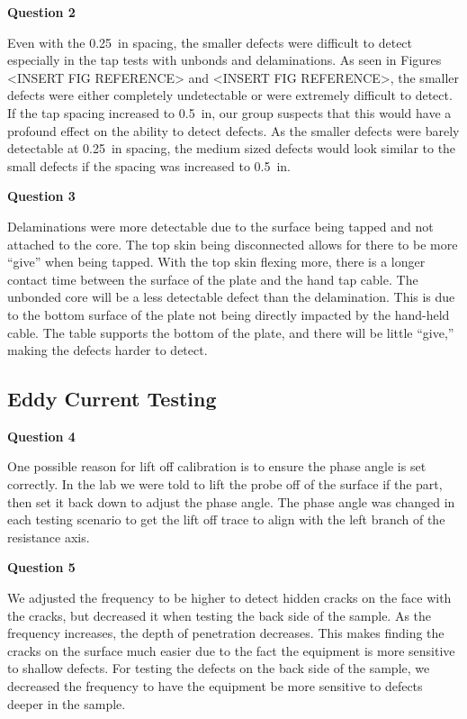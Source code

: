 \documentclass[12 pt]{report}
\begin{document}
\textbf{Question 2}

Even with the \qty{0.25}{in} spacing, the smaller defects were difficult to detect especially in the tap tests with unbonds and delaminations. As seen in Figures <INSERT FIG REFERENCE> and <INSERT FIG REFERENCE>, the smaller defects were either completely undetectable or were extremely difficult to detect. If the tap spacing increased to \qty{0.5}{in}, our group suspects that this would have a profound effect on the ability to detect defects. As the smaller defects were barely detectable at \qty{0.25}{in} spacing, the medium sized defects would look similar to the small defects if the spacing was increased to \qty{0.5}{in}. 

\textbf{Question 3}

Delaminations were more detectable due to the surface being tapped and not attached to the core. The top skin being disconnected allows for there to be more ``give'' when being tapped. With the top skin flexing more, there is a longer contact time between the surface of the plate and the hand tap cable. The unbonded core will be a less detectable defect than the delamination. This is due to the bottom surface of the plate not being directly impacted by the hand-held cable. The table supports the bottom of the plate, and there will be little ``give,'' making the defects harder to detect.

\subsection{Eddy Current Testing} \label{eddy_current_testing}
\textbf{Question 4}

One possible reason for lift off calibration is to ensure the phase angle is set correctly. In the lab we were told to lift the probe off of the surface if the part, then set it back down to adjust the phase angle. The phase angle was changed in each testing scenario to get the lift off trace to align with the left branch of the resistance axis.

\textbf{Question 5}

We adjusted the frequency to be higher to detect hidden cracks on the face with the cracks, but decreased it when testing the back side of the sample. As the frequency increases, the depth of penetration decreases. This makes finding the cracks on the surface much easier due to the fact the equipment is more sensitive to shallow defects. For testing the defects on the back side of the sample, we decreased the frequency to have the equipment be more sensitive to defects deeper in the sample.
\end{document}

